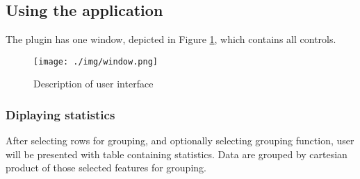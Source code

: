 \documentclass[12pt,a4paper]{article}
\begin{document}
\subsection{Using the application}
The plugin has one window, depicted in Figure \ref{window}, which contains all controls.

\begin{figure}[H]\centering
\texttt{[image: ./img/window.png]}
\caption{Description of user interface}
\label{window}
\end{figure}

\subsubsection{Diplaying statistics}
After selecting rows for grouping, and optionally selecting grouping function, user will be presented with table containing statistics.
Data are grouped by cartesian product of those selected features for grouping. 
\end{document}
